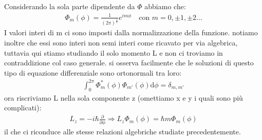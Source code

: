 Considerando la sola parte dipendente da $\Phi$ abbiamo che:
\begin{equation}\begin{split}
\Phi_m\left(\phi\right)=\frac{1}{\left(2\pi\right)^{\frac{1}{2}}}e^{im\phi} \quad \textrm{con } m=0,\pm 1, \pm 2 \dots
\end{split}\end{equation}
I valori interi di m ci sono imposti dalla normalizzazione della funzione. notiamo inoltre che essi sono interi non semi interi come ricavato per via algebrica, tuttavia qui stiamo studiando il solo momento L e non ci troviamo in contraddizione col caso generale.
si osserva facilmente che le soluzioni di questo tipo di equazione differenziale sono ortonormali tra loro:
\begin{equation}\begin{split}
\int_0^{2\pi}{\Phi_m^*\left(\phi\right)\Phi_{m'}\left(\phi\right)\textrm{d}\phi}=\delta_{m,m'}
\end{split}\end{equation}
ora riscriviamo L nella sola componente z (omettiamo x e y i quali sono più complicati):
\begin{equation}\begin{split}
L_z=-i\hbar \frac{\partial }{\partial \phi} \Longrightarrow L_z\Phi_m\left(\phi\right)=\hbar m\Phi_m\left(\phi\right)
\end{split}\end{equation}
il che ci riconduce alle stesse relazioni algebriche studiate precedentemente. 

